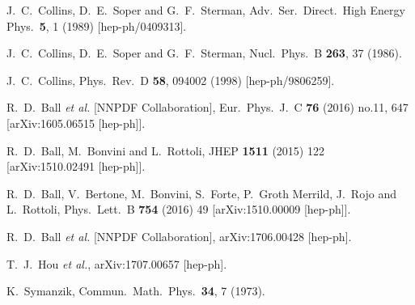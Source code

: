 \documentclass[letter,11pt]{article}
\begin{document}
\begin{thebibliography}{99}

  J.~C.~Collins, D.~E.~Soper and G.~F.~Sterman,
  Adv.\ Ser.\ Direct.\ High Energy Phys.\  {\bf 5}, 1 (1989)
  [hep-ph/0409313].

  J.~C.~Collins, D.~E.~Soper and G.~F.~Sterman,
  Nucl.\ Phys.\ B {\bf 263}, 37 (1986).

  J.~C.~Collins,
  Phys.\ Rev.\ D {\bf 58}, 094002 (1998)
  [hep-ph/9806259].

  R.~D.~Ball {\it et al.} [NNPDF Collaboration],
  Eur.\ Phys.\ J.\ C {\bf 76} (2016) no.11,  647
  [arXiv:1605.06515 [hep-ph]].

  R.~D.~Ball, M.~Bonvini and L.~Rottoli,
  JHEP {\bf 1511} (2015) 122
  [arXiv:1510.02491 [hep-ph]].

  R.~D.~Ball, V.~Bertone, M.~Bonvini, S.~Forte, P.~Groth Merrild, J.~Rojo and L.~Rottoli,
  Phys.\ Lett.\ B {\bf 754} (2016) 49
  [arXiv:1510.00009 [hep-ph]].

  R.~D.~Ball {\it et al.} [NNPDF Collaboration],
  arXiv:1706.00428 [hep-ph].

  T.~J.~Hou {\it et al.},
  arXiv:1707.00657 [hep-ph].

  K.~Symanzik,
  Commun.\ Math.\ Phys.\  {\bf 34}, 7 (1973).
  

\end{thebibliography}
\end{document}
